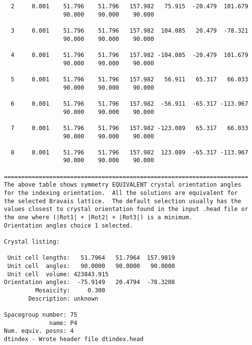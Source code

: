 \documentclass[a4paper, 11pt]{article}
\begin{document}
{\begin{verbatim}
  2     0.001    51.796    51.796   157.982   75.915  -20.479  101.679
                 90.000    90.000    90.000

  3     0.001    51.796    51.796   157.982  104.085   20.479  -78.321
                 90.000    90.000    90.000

  4     0.001    51.796    51.796   157.982 -104.085  -20.479  101.679
                 90.000    90.000    90.000

  5     0.001    51.796    51.796   157.982   56.911   65.317   66.033
                 90.000    90.000    90.000

  6     0.001    51.796    51.796   157.982  -56.911  -65.317 -113.967
                 90.000    90.000    90.000

  7     0.001    51.796    51.796   157.982 -123.089   65.317   66.033
                 90.000    90.000    90.000

  8     0.001    51.796    51.796   157.982  123.089  -65.317 -113.967
                 90.000    90.000    90.000

======================================================================
The above table shows symmetry EQUIVALENT crystal orientation angles
for the indexing orientation.  All the solutions are equivalent for
the selected Bravais lattice.  The default selection usually has the
values closest to crystal orientation found in the input .head file or
the one where (|Rot1| + |Rot2| + |Rot3|) is a minimum.
Orientation angles choice 1 selected.

Crystal listing:

 Unit cell lengths:   51.7964   51.7964  157.9819
 Unit cell  angles:   90.0000   90.0000   90.0000
 Unit cell  volume: 423843.915
Orientation angles:  -75.9149   20.4794  -78.3208
         Mosaicity:     0.300
       Description: unknown

Spacegroup number: 75
             name: P4
Num. equiv. posns: 4
dtindex - Wrote header file dtindex.head



\end{verbatim}
}
\end{document}
